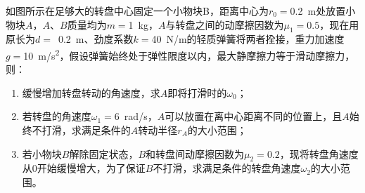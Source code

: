 如图所示在足够大的转盘中心固定一个小物块B，距离中心为\(r_0 =\)\qty{0.2}{m}处放置小物块\(A\)，\(A\)、\(B\)质量均为\(m =\)\qty{1}{kg}，\(A\)与转盘之间的动摩擦因数为\(\mu_1 = 0.5\)，现在用原长为\(d =\) \,\qty{0.2}{m}、劲度系数\(k =\)\qty{40}{N/m}的轻质弹簧将两者拴接，重力加速度\(g =\)\qty{10}{m/s^2}，假设弹簧始终处于弹性限度以内，最大静摩擦力等于滑动摩擦力，则：
\begin{enumerate}
    \item 缓慢增加转盘转动的角速度，求\(A\)即将打滑时的\(\omega_0\)；
    \item 若转盘的角速度\(\omega_1 =\)\qty{6}{rad/s}，\(A\)可以放置在离中心距离不同的位置上，且\(A\)始终不打滑，求满足条件的\(A\)转动半径\(r_A\)的大小范围；
    \item 若小物块\(B\)解除固定状态，\(B\)和转盘间动摩擦因数为\(\mu_2 = 0.2\)，现将转盘角速度从0开始缓慢增大，为了保证\(B\)不打滑，求满足条件的转盘角速度\(\omega_2\)的大小范围。
\end{enumerate}

